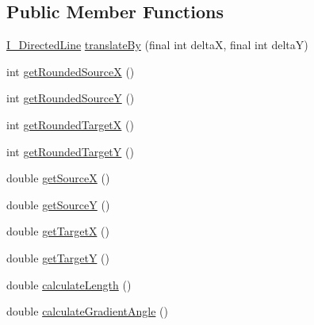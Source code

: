 \subsection*{Public Member Functions}
\begin{DoxyCompactItemize}
\item 
\hyperlink{interfaceorg_1_1tzi_1_1use_1_1gui_1_1views_1_1diagrams_1_1util_1_1_i___directed_line}{I\-\_\-\-Directed\-Line} \hyperlink{interfaceorg_1_1tzi_1_1use_1_1gui_1_1views_1_1diagrams_1_1util_1_1_i___directed_line_ae9cbe7a1a6da918000a221194cf3403f}{translate\-By} (final int delta\-X, final int delta\-Y)
\item 
int \hyperlink{interfaceorg_1_1tzi_1_1use_1_1gui_1_1views_1_1diagrams_1_1util_1_1_i___directed_line_afbe35d4ce607b534035e41215f370c1a}{get\-Rounded\-Source\-X} ()
\item 
int \hyperlink{interfaceorg_1_1tzi_1_1use_1_1gui_1_1views_1_1diagrams_1_1util_1_1_i___directed_line_a04e39dd81a85e816f513e6772e0d2d91}{get\-Rounded\-Source\-Y} ()
\item 
int \hyperlink{interfaceorg_1_1tzi_1_1use_1_1gui_1_1views_1_1diagrams_1_1util_1_1_i___directed_line_ad7d87c48390748d3bef1be3be4e1a6c9}{get\-Rounded\-Target\-X} ()
\item 
int \hyperlink{interfaceorg_1_1tzi_1_1use_1_1gui_1_1views_1_1diagrams_1_1util_1_1_i___directed_line_a31981b806cfed8f83b5b04d08dba825b}{get\-Rounded\-Target\-Y} ()
\item 
double \hyperlink{interfaceorg_1_1tzi_1_1use_1_1gui_1_1views_1_1diagrams_1_1util_1_1_i___directed_line_a381e25e1b624a6a09abbcea9ae669fcd}{get\-Source\-X} ()
\item 
double \hyperlink{interfaceorg_1_1tzi_1_1use_1_1gui_1_1views_1_1diagrams_1_1util_1_1_i___directed_line_ab6e9f0379d5c766a6de35dcd4564c3bc}{get\-Source\-Y} ()
\item 
double \hyperlink{interfaceorg_1_1tzi_1_1use_1_1gui_1_1views_1_1diagrams_1_1util_1_1_i___directed_line_a051bd5cc64b96734352ba7642d28d08d}{get\-Target\-X} ()
\item 
double \hyperlink{interfaceorg_1_1tzi_1_1use_1_1gui_1_1views_1_1diagrams_1_1util_1_1_i___directed_line_a662d6a94a438fdec7c74c87a30865d85}{get\-Target\-Y} ()
\item 
double \hyperlink{interfaceorg_1_1tzi_1_1use_1_1gui_1_1views_1_1diagrams_1_1util_1_1_i___directed_line_a03597a7090ab8720c7b993b3cd585015}{calculate\-Length} ()
\item 
double \hyperlink{interfaceorg_1_1tzi_1_1use_1_1gui_1_1views_1_1diagrams_1_1util_1_1_i___directed_line_a22b3f36ba98e1d2b733c5628ddfba706}{calculate\-Gradient\-Angle} ()

\end{DoxyCompactItemize}
